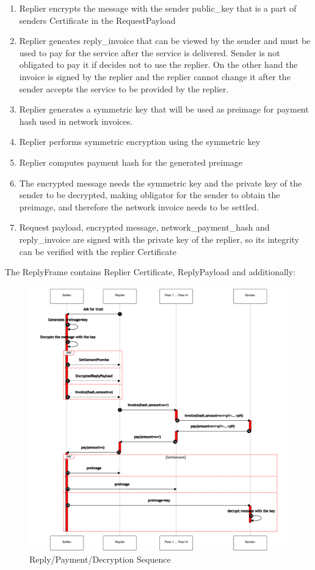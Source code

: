 \documentclass{article}
\begin{document}
\begin{enumerate}
	\item Replier encrypts the message with the sender public\_key that is a part of senders Certificate in the RequestPayload
	\item Replier geneates reply\_invoice that can be viewed by the sender and must be used to pay for the service after the service is delivered. Sender is not obligated to pay it if decides not to use the replier. On the other hand the invoice is signed by the replier and the replier cannot change it after the sender accepts the service to be provided by the replier.
	\item Replier generates a symmetric key that will be used as preimage for payment hash used in network invoices.
	\item Replier performs symmetric encryption using the symmetric key
	\item Replier computes payment hash for the generated preimage
	\item The encrypted message needs the symmetric key and the private key of the sender to be decrypted, making obligator for the sender to obtain the preimage, and therefore the network invoice needs to be settled.
	\item Request payload, encrypted message, network\_payment\_hash and reply\_invoice are signed with the private key of the replier, so its integrity can be verified with the replier Certificate
\end{enumerate}

The ReplyFrame contains Replier Certificate, ReplyPayload and additionally:

\begin{figure}
	\centering
	\includegraphics[scale=0.5]{ReplyAndPay.pdf}
	\caption{Reply/Payment/Decryption Sequence}
	\label{fig:replyandpay}
\end{figure}
\end{document}
